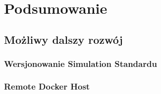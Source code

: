 \chapter{Podsumowanie}
\label{cha:podsumowanie}

\section{Możliwy dalszy rozwój}

\subsection{Wersjonowanie Simulation Standardu}

\subsection{Remote Docker Host} %